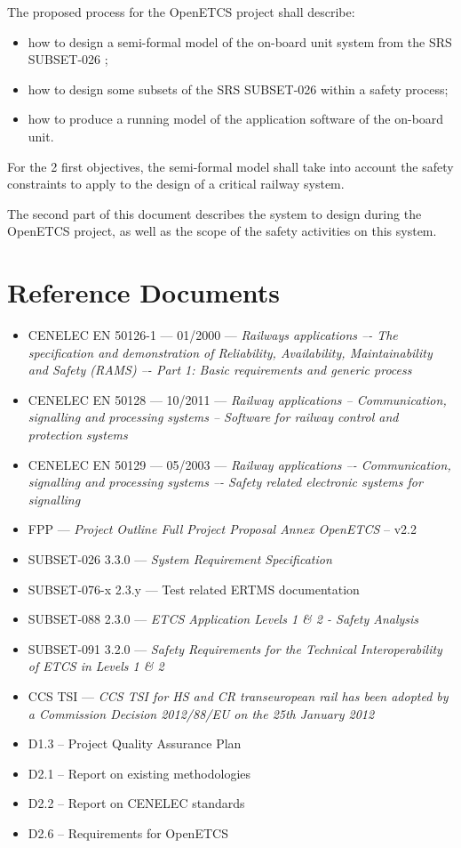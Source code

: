 The proposed process for the OpenETCS project shall describe:
\begin{itemize}
\item how to design a semi-formal model of the on-board unit system from the SRS SUBSET-026 ;
\item how to design some subsets of the SRS SUBSET-026 within a safety process;
\item how to produce a running model of the application software of the on-board unit.
\end{itemize}

For the 2 first objectives, the semi-formal  model  shall take into account the safety constraints to apply to the design of a critical railway system.

The second part of this document describes the system to design during the OpenETCS project, as well as the scope of the safety activities on this system.


\section{Reference Documents}
\begin{itemize}
\item CENELEC EN 50126-1 --- 01/2000 --- \emph{Railways applications –- The specification and
demonstration of Reliability, Availability, Maintainability and Safety (RAMS) –- Part 1:
Basic requirements and generic process}
\item CENELEC EN 50128 --- 10/2011 --- \emph{Railway applications -- Communication, signalling and
processing systems -- Software for railway control and protection systems}
\item CENELEC EN 50129 --- 05/2003 --- \emph{Railway applications –- Communication, signalling and
processing systems –- Safety related electronic systems for signalling}
\item FPP --- \emph{Project Outline Full Project Proposal Annex OpenETCS} -- v2.2
\item SUBSET-026 3.3.0 --- \emph{System Requirement Specification}
\item SUBSET-076-x 2.3.y --- Test related ERTMS documentation
\item SUBSET-088 2.3.0 --- \emph{ETCS Application Levels 1 \& 2 - Safety Analysis}
\item SUBSET-091 3.2.0 --- \emph{Safety Requirements for the Technical Interoperability
of ETCS in Levels 1 \& 2}
\item CCS TSI --- \emph{ CCS TSI for HS and CR transeuropean rail has been adopted by a Commission Decision 2012/88/EU on the 25th January 2012}
\item D1.3 -- Project Quality Assurance Plan
\item D2.1 -- Report on existing methodologies 
\item D2.2 -- Report on CENELEC standards
\item D2.6 -- Requirements for OpenETCS
\end{itemize}

